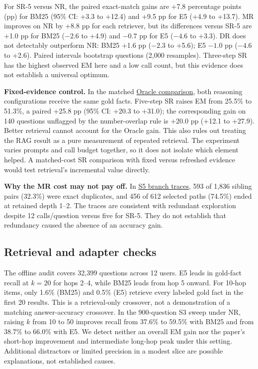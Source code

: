 \documentclass[sigconf,nonacm,10pt,balance=false]{acmart}
\newcommand{\baseurl}{https://github.com/xphiwork-dot/mpr-study/blob/main}
\newcommand{\repo}[2]{\href{\baseurl/#1}{#2}}
\newcommand{\emphlabel}[1]{\par\smallskip\noindent\textbf{#1}\enspace}
\begin{document}
For SR-5 versus NR, the paired exact-match gains are +7.8 percentage points (pp) for BM25 (95\% CI: +3.3 to +12.4) and +9.5 pp for E5 (+4.9 to +13.7). MR improves on NR by +8.8 pp for each retriever, but its differences versus SR-5 are +1.0 pp for BM25 ($-2.6$ to +4.9) and $-0.7$ pp for E5 ($-4.6$ to +3.3). DR does not detectably outperform NR: BM25 +1.6 pp ($-2.3$ to +5.6); E5 $-1.0$ pp ($-4.6$ to +2.6). Paired intervals bootstrap questions (2,000 resamples). Three-step SR has the highest observed EM here and a low call count, but this evidence does not establish a universal optimum.

\emphlabel{Fixed-evidence control.} In the matched \repo{results/t4/summary_s2_vs_s1.md}{Oracle comparison}, both reasoning configurations receive the same gold facts. Five-step SR raises EM from 25.5\% to 51.3\%, a paired +25.8 pp (95\% CI: +20.3 to +31.0); the corresponding gain on 140 questions unflagged by the number-overlap rule is +20.0 pp (+12.1 to +27.9). Better retrieval cannot account for the Oracle gain. This also rules out treating the RAG result as a pure measurement of repeated retrieval. The experiment varies prompts and call budget together, so it does not isolate which element helped. A matched-cost SR comparison with fixed versus refreshed evidence would test retrieval's incremental value directly.

\emphlabel{Why the MR cost may not pay off.} In \repo{results/t4/s5_mr/summary_mr.md}{S5 branch traces}, 593 of 1,836 sibling pairs (32.3\%) were exact duplicates, and 456 of 612 selected paths (74.5\%) ended at retained depth 1--2. The traces are consistent with redundant exploration despite 12 calls/question versus five for SR-5. They do not establish that redundancy caused the absence of an accuracy gain.

\newpage
\subsection{Retrieval and adapter checks}
The offline audit covers 32,399 questions across 12 users. E5 leads in gold-fact recall at $k=20$ for hops 2--4, while BM25 leads from hop 5 onward. For 10-hop items, only 1.6\% (BM25) and 0.5\% (E5) retrieve every labeled gold fact in the first 20 results. This is a retrieval-only crossover, not a demonstration of a matching answer-accuracy crossover. In the 900-question S3 sweep under NR, raising $k$ from 10 to 50 improves recall from 37.6\% to 59.5\% with BM25 and from 38.7\% to 66.0\% with E5. We detect neither an overall EM gain nor the paper's short-hop improvement and intermediate long-hop peak under this setting. Additional distractors or limited precision in a modest slice are possible explanations, not established causes.
\end{document}
